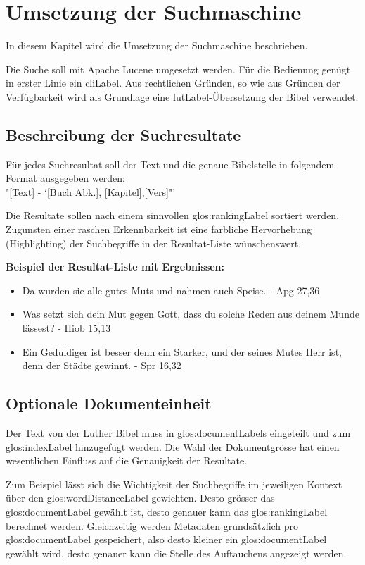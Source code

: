\chapter{Umsetzung der Suchmaschine}
In diesem Kapitel wird die Umsetzung der Suchmaschine beschrieben.

Die Suche soll mit Apache Lucene umgesetzt werden. Für die Bedienung genügt in erster Linie ein \gls{cliLabel}.
Aus rechtlichen Gründen, so wie aus Gründen der Verfügbarkeit wird als Grundlage eine \gls{lutLabel}-Übersetzung der Bibel verwendet.

\section{Beschreibung der Suchresultate}
Für jedes Suchresultat soll der Text und die genaue Bibelstelle in folgendem Format ausgegeben werden:\\
"[Text] - `[Buch Abk.], [Kapitel],[Vers]"'

Die Resultate sollen nach einem sinnvollen \gls{glos:rankingLabel} sortiert werden.
Zugunsten einer raschen Erkennbarkeit ist eine farbliche Hervorhebung (Highlighting) der Suchbegriffe in der Resultat-Liste wünschenswert.

\textbf{Beispiel der Resultat-Liste mit Ergebnissen:}
\begin{itemize}[noitemsep]
	\item Da wurden sie alle gutes Muts und nahmen auch Speise. - Apg 27,36
	\item Was setzt sich dein Mut gegen Gott, dass du solche Reden aus deinem Munde lässest? - Hiob 15,13
	\item Ein Geduldiger ist besser denn ein Starker, und der seines Mutes Herr ist, denn der Städte gewinnt. - Spr 16,32
\end{itemize}


\section{Optionale Dokumenteinheit}
Der Text von der Luther Bibel muss in \glspl{glos:documentLabel} eingeteilt und zum \gls{glos:indexLabel} hinzugefügt werden.
Die Wahl der Dokumentgrösse hat einen wesentlichen Einfluss auf die Genauigkeit der Resultate.

Zum Beispiel lässt sich die Wichtigkeit der Suchbegriffe im jeweiligen Kontext über den \gls{glos:wordDistanceLabel} gewichten.
Desto grösser das \gls{glos:documentLabel} gewählt ist, desto genauer kann das \gls{glos:rankingLabel} berechnet werden.
Gleichzeitig werden Metadaten grundsätzlich pro \gls{glos:documentLabel} gespeichert, also desto kleiner ein \gls{glos:documentLabel} gewählt wird, desto genauer kann die Stelle des Auftauchens angezeigt werden.

